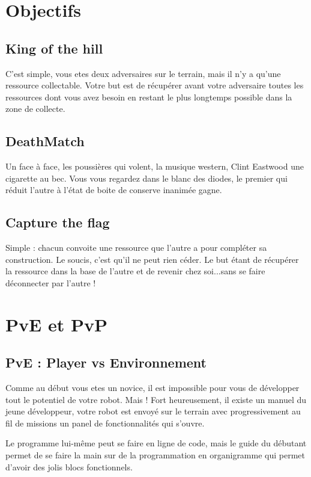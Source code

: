 \documentclass[10pt]{article}
\begin{document}
\section{Objectifs}
\subsection{King of the hill}

C'est simple, vous etes deux adversaires sur le terrain, mais il n'y a qu'une ressource collectable. Votre but est de récupérer avant votre adversaire toutes les ressources dont vous avez besoin en restant le plus longtemps possible dans la zone de collecte.

\subsection{DeathMatch}

Un face à face, les poussières qui volent, la musique western, Clint Eastwood une cigarette au bec. Vous vous regardez dans le blanc des diodes, le premier qui réduit l'autre à l'état de boite de conserve inanimée gagne.

\subsection{Capture the flag}

Simple : chacun convoite une ressource que l'autre a pour compléter sa construction. Le soucis, c'est qu'il ne peut rien céder. Le but étant de récupérer la ressource dans la base de l'autre et de revenir chez soi...sans se faire déconnecter par l'autre !

\section{PvE et PvP}
\subsection{PvE : Player vs Environnement}

Comme au début vous etes un novice, il est impossible pour vous de développer tout le potentiel de votre robot. Mais ! Fort heureusement, il existe un manuel du jeune développeur, votre robot est envoyé sur le terrain avec progressivement au fil de missions un panel de fonctionnalités qui s'ouvre.
	
Le programme lui-même peut se faire en ligne de code, mais le guide du débutant permet de se faire la main sur de la programmation en organigramme qui permet d'avoir des jolis blocs fonctionnels.
\end{document}
